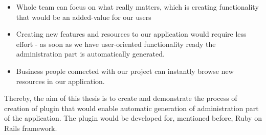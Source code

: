  \begin{itemize}
	  \item Whole team can focus on what really matters, which is creating functionality that would be an added-value for our users
	  \item Creating new features and resources to our application would require less effort - as soon as we have user-oriented functionality ready the administration part is automatically generated.
	  \item Business people connected with our project can instantly browse new resources in our application.
	\end{itemize}
  
  Thereby, the aim of this thesis is to create and demonstrate the process of creation of plugin that would enable automatic generation of administration part of the application. The plugin would be developed for, mentioned before, Ruby on Rails framework.
  
